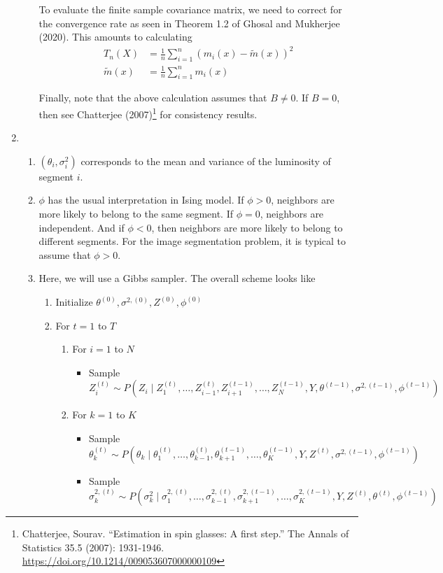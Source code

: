 \documentclass[11pt]{article}
\begin{document}
\begin{enumerate}
\begin{enumerate}
To evaluate the finite sample covariance matrix, we need to correct for the convergence rate as seen in Theorem 1.2 of Ghosal and Mukherjee (2020). This amounts to calculating
\begin{align*}
	T_n(X) &= \frac{1}{n} \sum_{i=1}^n (m_i(x) - \tilde{m}(x))^2 \\
	\tilde{m}(x) &= \frac{1}{n} \sum_{i=1}^n m_i(x)
\end{align*}

Finally, note that the above calculation assumes that $B \neq 0$. If $B = 0$, then see Chatterjee (2007)\footnote{Chatterjee, Sourav. ``Estimation in spin glasses: A first step.'' The Annals of Statistics 35.5 (2007): 1931-1946. \url{https://doi.org/10.1214/009053607000000109}} for consistency results.

\end{enumerate}


\item
\begin{enumerate}

\item $(\theta_i, \sigma_i^2)$ corresponds to the mean and variance of the luminosity of segment $i$.

\item $\phi$ has the usual interpretation in Ising model. If $\phi > 0$, neighbors are more likely to belong to the same segment. If $\phi = 0$, neighbors are independent. And if $\phi < 0$, then neighbors are more likely to belong to different segments. For the image segmentation problem, it is typical to assume that $\phi > 0$.

\item Here, we will use a Gibbs sampler. The overall scheme looks like

\begin{enumerate}[label=(\arabic*)]
\item Initialize $\theta^{(0)}, \sigma^{2, (0)}, Z^{(0)}, \phi^{(0)}$
\item For $t = 1$ to $T$
\begin{enumerate}[label=(\roman*)]
	\item For $i = 1$ to $N$
		\begin{itemize}
			\item Sample $Z_i^{(t)} \sim P(Z_i \mid Z_1^{(t)}, \dots, Z_{i-1}^{(t)}, Z_{i+1}^{(t-1)}, \dots, Z_{N}^{(t-1)}, Y, \theta^{(t-1)}, \sigma^{2, (t-1)}, \phi^{(t-1)})$
		\end{itemize}
		
	\item For $k = 1$ to $K$
		\begin{itemize}
			\item Sample $\theta_k^{(t)} \sim P(\theta_k \mid \theta_1^{(t)}, \dots, \theta_{k-1}^{(t)}, \theta_{k+1}^{(t-1)}, \dots, \theta_{K}^{(t-1)}, Y, Z^{(t)}, \sigma^{2, (t-1)}, \phi^{(t-1)})$
			\item Sample $\sigma_k^{2, (t)} \sim P(\sigma^2_k \mid \sigma_1^{2, (t)}, \dots, \sigma_{k-1}^{2, (t)}, \sigma_{k+1}^{2, (t-1)}, \dots, \sigma_{K}^{2, (t-1)}, Y, Z^{(t)}, \theta^{(t)}, \phi^{(t-1)})$
		\end{itemize}
	

\end{enumerate}
\end{enumerate}
\end{enumerate}
\end{enumerate}
\end{document}
